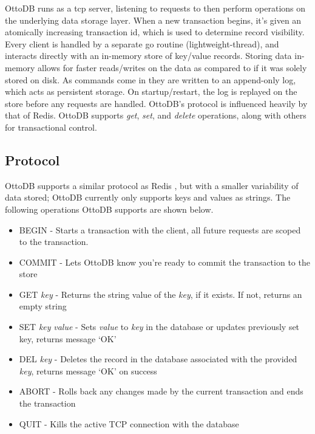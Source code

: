 \documentclass[conference]{IEEEtran}
\begin{document}
    OttoDB runs as a tcp server, listening to requests to then perform operations on the underlying data storage layer. When a new transaction begins, it's given an atomically increasing transaction id, which is used to determine record visibility. Every client is handled by a separate go routine (lightweight-thread), and interacts directly with an in-memory store of key/value records. Storing data in-memory allows for faster reads/writes on the data as compared to if it was solely stored on disk. As commands come in they are written to an append-only log, which acts as persistent storage. On startup/restart, the log is replayed on the store before any requests are handled. OttoDB's protocol is influenced heavily by that of Redis. OttoDB supports \textit{get}, \textit{set}, and \textit{delete} operations, along with others for transactional control.

    \subsection{Protocol}

    OttoDB supports a similar protocol as Redis \cite{b1}, but with a smaller variability of data stored; OttoDB currently only supports keys and values as strings. The following operations OttoDB supports are shown below.

    \begin{itemize}
        \item BEGIN - Starts a transaction with the client, all future requests are scoped to the transaction.
        \item COMMIT - Lets OttoDB know you're ready to commit the transaction to the store
        \item GET \textit{key} - Returns the string value of the \textit{key}, if it exists. If not, returns an empty string
        \item SET \textit{key} \textit{value} - Sets \textit{value} to \textit{key} in the database or updates previously set key, returns message ‘OK’
        \item DEL \textit{key} - Deletes the record in the database associated with the provided \textit{key}, returns message ‘OK’ on success
        \item ABORT - Rolls back any changes made by the current transaction and ends the transaction
        \item QUIT - Kills the active TCP connection with the database
    \end{itemize}
\end{document}
